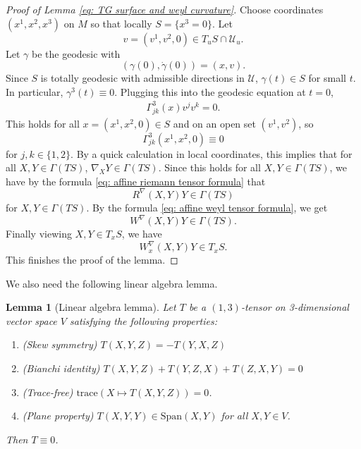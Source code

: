 \documentclass{article}
\numberwithin{equation}{section}
\theoremstyle{plain}
\newtheorem{lemma}[theorem]{Lemma}
\begin{document}
    \begin{proof}[Proof of Lemma \ref{eq: TG surface and weyl curvature}]
        Choose coordinates $(x^1,x^2,x^3)$ on $M$ so that locally $S = \{x^3 =0\}$. Let 
        \begin{equation}
        v = (v^1,v^2,0) \in T_u S \cap \mathcal U_u.
        \end{equation}
         Let $\gamma$ be the geodesic with 
         \begin{equation}
         (\gamma(0),\dot \gamma(0)) = (x, v).
         \end{equation}
          Since $S$ is totally geodesic with admissible directions in $\mathcal U$, $\gamma(t) \in S$ for small $t$. In particular, $\gamma^3(t) \equiv 0$. Plugging this into the geodesic equation at $t = 0$, 
        \begin{align}
            \Gamma_{jk}^3(x) v^j v^k = 0.
        \end{align}
        This holds for all $x = (x^1,x^2,0)\in S$ and on an open set $(v^1,v^2)$, so 
        \begin{equation}
        \Gamma_{jk}^3(x^1,x^2,0) \equiv 0
        \end{equation}
         for $j,k \in \{1,2\}$. By a quick calculation in local coordinates, this implies that for all $X,Y \in \Gamma(TS)$, $\nabla_X Y \in \Gamma(TS)$.
        Since this holds for all $X,Y \in \Gamma(TS)$, we have by the formula \eqref{eq: affine riemann tensor formula} that 
        \begin{equation}
        R^\nabla(X,Y)Y \in \Gamma(T S)
        \end{equation}
         for $X,Y \in \Gamma(TS)$. By the formula \eqref{eq: affine weyl tensor formula}, we get 
         \begin{equation}
         W^\nabla(X,Y)Y \in \Gamma(T S).
         \end{equation}
          Finally viewing $X,Y \in T_xS$, we have 
          \begin{equation}
          W_x^\nabla(X,Y)Y \in T_x S.
          \end{equation}
          This finishes the proof of the lemma. 
    \end{proof}

    We also need the following linear algebra lemma.
    \begin{lemma}[Linear algebra lemma]\label{lem: lin alg lemma}
    Let $T$ be a $(1,3)$-tensor on 3-dimensional vector space $V$ satisfying the following properties: 
    \begin{enumerate}
        \item (Skew symmetry) $T(X,Y,Z) = -T(Y,X,Z)$ 
        \item (Bianchi identity) $T(X,Y,Z) + T(Y,Z,X)+T(Z,X,Y) = 0$ 
        \item (Trace-free) $\mathrm{trace}(X \mapsto T(X,Y,Z)) = 0$.
        \item (Plane property) $T(X,Y,Y) \in \mathrm{Span}(X,Y)$ for all $X,Y \in V$.
    \end{enumerate}
    Then $T \equiv 0$. 
    \end{lemma}
\end{document}
